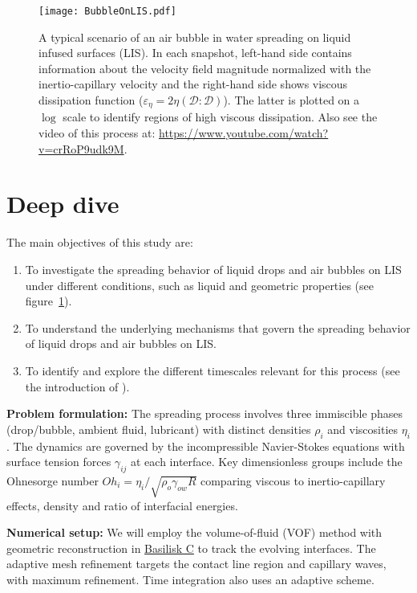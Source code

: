 \documentclass[a4paper,10pt]{article}
\begin{document}
\begin{figure}
\begin{center}
	\texttt{[image: BubbleOnLIS.pdf]}
	\caption{A typical scenario of an air bubble in water spreading on liquid infused surfaces (LIS). In each snapshot, left-hand side contains information about the velocity field magnitude normalized with the inertio-capillary velocity and the right-hand side shows viscous dissipation function ($\varepsilon_\eta = 2\eta\left(\boldsymbol{\mathcal{D}:\mathcal{D}}\right)$). The latter is plotted on a $\log$ scale to identify regions of high viscous dissipation. Also see the video of this process at: \href{https://www.youtube.com/watch?v=crRoP9udk9M}{https://www.youtube.com/watch?v=crRoP9udk9M}.}
	\label{Figure::Typical}
\end{center}
\end{figure}

\section*{Deep dive}

The main objectives of this study are:

\begin{enumerate}
\item To investigate the spreading behavior of liquid drops and air bubbles on LIS under different conditions, such as liquid and geometric properties (see figure~\ref{Figure::Typical}). 
\item To understand the underlying mechanisms that govern the spreading behavior of liquid drops and air bubbles on LIS. 
\item To identify and explore the different timescales relevant for this process (see the introduction of \citet{VatsalThesis}).
\end{enumerate}

\noindent \textbf{Problem formulation:} The spreading process involves three immiscible phases (drop/bubble, ambient fluid, lubricant) with distinct densities $\rho_i$ and viscosities $\eta_i$. The dynamics are governed by the incompressible Navier-Stokes equations with surface tension forces $\gamma_{ij}$ at each interface. Key dimensionless groups include the Ohnesorge number $Oh_i = \eta_i/\sqrt{\rho_o\gamma_{ow}R}$ comparing viscous to inertio-capillary effects, density and ratio of interfacial energies. 

\noindent \textbf{Numerical setup:} We will employ the volume-of-fluid (VOF) method with geometric reconstruction in \href{https://github.com/comphy-lab/Bubble-at-Lubis}{Basilisk C} to track the evolving interfaces. The adaptive mesh refinement targets the contact line region and capillary waves, with maximum refinement. Time integration also uses an adaptive scheme.
\end{document}
